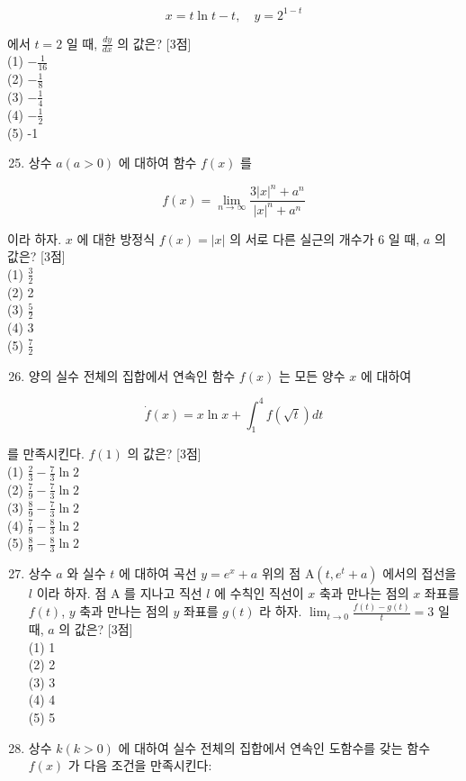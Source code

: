 \documentclass[10pt]{article}
\begin{document}
\[
x=t \ln t-t, \quad y=2^{1-t}
\]

에서 \(t=2\) 일 때, \(\frac{d y}{d x}\) 의 값은? [3점]\\
(1) \(-\frac{1}{16}\)\\
(2) \(-\frac{1}{8}\)\\
(3) \(-\frac{1}{4}\)\\
(4) \(-\frac{1}{2}\)\\
(5) -1

\begin{enumerate}
  \setcounter{enumi}{24}
  \item 상수 \(a(a>0)\) 에 대하여 함수 \(f(x)\) 를
\end{enumerate}

\[
f(x)=\lim _{n \rightarrow \infty} \frac{3|x|^{n}+a^{n}}{|x|^{n}+a^{n}}
\]

이라 하자. \(x\) 에 대한 방정식 \(f(x)=|x|\) 의 서로 다른 실근의 개수가 6 일 때, \(a\) 의 값은? [3점]\\
(1) \(\frac{3}{2}\)\\
(2) 2\\
(3) \(\frac{5}{2}\)\\
(4) 3\\
(5) \(\frac{7}{2}\)

\begin{enumerate}
  \setcounter{enumi}{25}
  \item 양의 실수 전체의 집합에서 연속인 함수 \(f(x)\) 는 모든 양수 \(x\) 에 대하여
\end{enumerate}

\[
\dot{f}(x)=x \ln x+\int_{1}^{4} f(\sqrt{t}) d t
\]

를 만족시킨다. \(f(1)\) 의 값은? [3점]\\
(1) \(\frac{2}{3}-\frac{7}{3} \ln 2\)\\
(2) \(\frac{7}{9}-\frac{7}{3} \ln 2\)\\
(3) \(\frac{8}{9}-\frac{7}{3} \ln 2\)\\
(4) \(\frac{7}{9}-\frac{8}{3} \ln 2\)\\
(5) \(\frac{8}{9}-\frac{8}{3} \ln 2\)

\begin{enumerate}
  \setcounter{enumi}{26}
  \item 상수 \(a\) 와 실수 \(t\) 에 대하여 곡선 \(y=e^{x}+a\) 위의 점 \(\mathrm{A}\left(t, e^{t}+a\right)\) 에서의 접선을 \(l\) 이라 하자. 점 A 를 지나고 직선 \(l\) 에 수칙인 직선이 \(x\) 축과 만나는 점의 \(x\) 좌표를 \(f(t)\), \(y\) 축과 만나는 점의 \(y\) 좌표를 \(g(t)\) 라 하자. \(\lim _{t \rightarrow 0} \frac{f(t)-g(t)}{t}=3\) 일 때, \(a\) 의 값은? [3점]\\
(1) 1\\
(2) 2\\
(3) 3\\
(4) 4\\
(5) 5

  \item 상수 \(k(k>0)\) 에 대하여 실수 전체의 집합에서 연속인 도함수를 갖는 함수 \(f(x)\) 가 다음 조건을 만족시킨다:

\end{enumerate}
\end{document}
